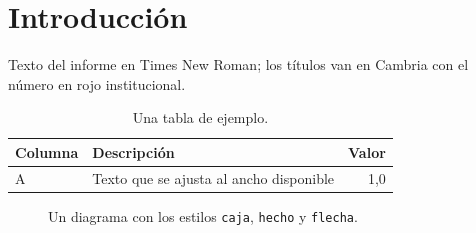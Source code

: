 \documentclass[11pt,letterpaper]{article}
\begin{document}
\UDportada
\tableofcontents
\newpage

\section{Introducción}

Texto del informe en Times New Roman; los títulos van en Cambria con el número en rojo institucional.

\begin{table}[!htbp]
\centering
\caption{Una tabla de ejemplo.}
\begin{tabularx}{\linewidth}{l L r}
\toprule
Columna & Descripción & Valor \\
\midrule
A & Texto que se ajusta al ancho disponible & 1,0 \\
\bottomrule
\end{tabularx}
\end{table}

\begin{figure}[!htbp]
\centering
{}
\caption{Un diagrama con los estilos \texttt{caja}, \texttt{hecho} y \texttt{flecha}.}
\end{figure}
\end{document}
